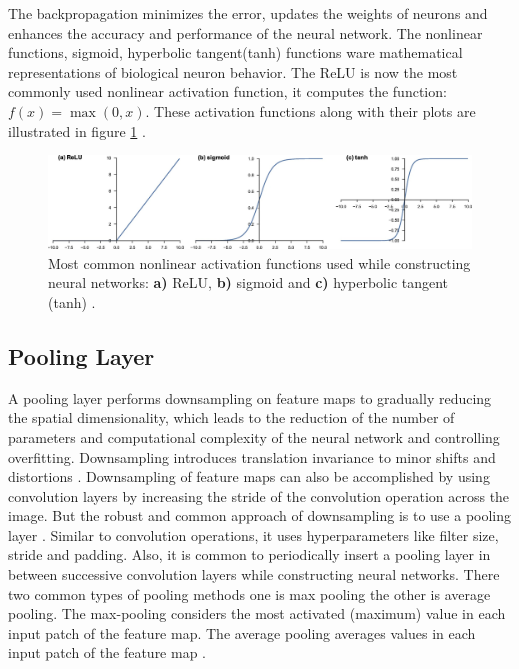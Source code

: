 The backpropagation minimizes the error, updates the weights of neurons and enhances the accuracy and performance of the neural network. The nonlinear functions, sigmoid, hyperbolic tangent(tanh) functions ware mathematical representations of biological neuron behavior. The \ac{ReLU} is now the most commonly used nonlinear activation function, it computes the function: $f(x) = \max(0, x)$. These activation functions along with their plots are illustrated in figure \ref{fig:ActivationFunctions} \cite{LeCun.2015} \cite{NIPS2012_c399862d}.





\vspace*{0.5cm}

\begin{figure}[H]
        \begin{center}
	    \includegraphics[scale=0.42]{images/Fundamentals/ActivationFunctions.jpg}
	    \caption[Most common nonlinear activation functions used while constructing Neural Networks.]{Most common nonlinear activation functions used while constructing neural networks: \textbf{a)} \ac{ReLU}, \textbf{b)} sigmoid and \textbf{c)} hyperbolic tangent (tanh) \cite{articleCNNs}.}
	    \label{fig:ActivationFunctions}
	    \end{center}
\end{figure}

\subsection{Pooling Layer}\label{PoolingLayer}
A pooling layer performs downsampling on feature maps to gradually reducing the spatial dimensionality, which leads to the reduction of the number of parameters and computational complexity of the neural network and controlling overfitting. Downsampling introduces translation invariance to minor shifts and distortions \cite{goodfellow2017deep}. Downsampling of feature maps can also be accomplished by using convolution layers by increasing the stride of the convolution operation across the image. But the robust and common approach of downsampling is to use a pooling layer \cite{goodfellow2017deep}. Similar to convolution operations, it uses hyperparameters like filter size, stride and padding. Also, it is common to periodically insert a pooling layer in between successive convolution layers while constructing neural networks. There two common types of pooling methods one is max pooling the other is average pooling. The max-pooling considers the most activated (maximum) value in each input patch of the feature map. The average pooling averages values in each input patch of the feature map \cite{10.1007/978-3-642-15825-4_10}.

